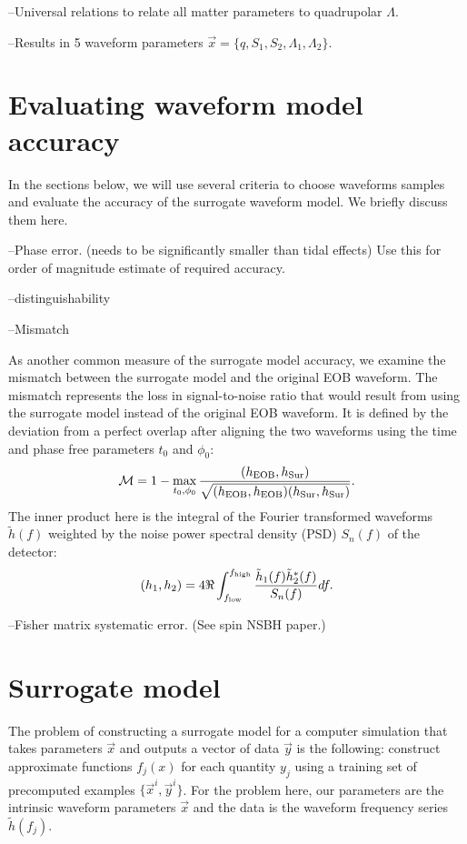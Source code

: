 \documentclass[prd,aps,letter,twocolumn,floatfix,notitlepage]{revtex4-1}
\begin{document}
--Universal relations to relate all matter parameters to quadrupolar $\Lambda$.

--Results in 5 waveform parameters $\vec x=\{q, S_1, S_2, \Lambda_1, \Lambda_2\}$.

\section{Evaluating waveform model accuracy}

In the sections below, we will use several criteria to choose waveforms samples and evaluate the accuracy of the 
surrogate waveform model. We briefly discuss them here.

--Phase error. (needs to be significantly smaller than tidal effects) Use this for order of magnitude estimate of required
accuracy.

--distinguishability

--Mismatch

As another common measure of the surrogate model accuracy, we examine the mismatch between 
the surrogate model and the original EOB waveform.
The mismatch represents the loss in signal-to-noise ratio that would result 
from using the surrogate model instead of the original EOB waveform. 
It is defined by the deviation from a perfect overlap after aligning the two waveforms
using the time and phase free parameters $t_0$ and $\phi_0$:
\begin{equation}
\mathcal{M} = 1 - \max_{t_0, \phi_0} \frac{(h_{\rm EOB}, h_{\rm Sur})} {\sqrt{(h_{\rm EOB}, h_{\rm EOB}) (h_{\rm Sur}, h_{\rm Sur})}}.
\end{equation}
The inner product here  is the integral of the Fourier transformed waveforms $\tilde h(f)$ weighted by the noise power spectral 
density (PSD) $S_n(f)$ of the detector:
\begin{equation}
(h_1, h_2) = 4 \Re \int_{f_{\rm low}}^{f_{\rm high}} \frac{\tilde h_1(f) \tilde h^*_2(f)} {S_n(f)} df.
\end{equation}

--Fisher matrix systematic error. (See spin NSBH paper.)

\section{Surrogate model}

The problem of constructing a surrogate model for a computer simulation that takes parameters 
$\vec x$ and outputs a vector of data $\vec y$ is the following: construct approximate functions $f_j(x)$
for each quantity $y_j$ using a training set of precomputed examples $\{\vec x^i, \vec y^i\}$. For the problem here, 
our parameters are the intrinsic waveform parameters $\vec x$ and the data is the waveform frequency series $\tilde h(f_j)$. 
\end{document}
